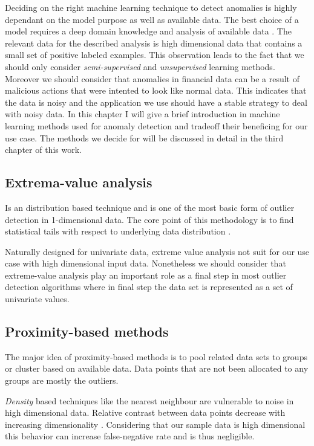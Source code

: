 Deciding on the right machine learning technique to detect anomalies is highly dependant on the model purpose as well as available data. The best choice of a model requires a deep domain knowledge and analysis of available data \cite{Aggarwal:2013}. The relevant data for the described analysis is high dimensional data that contains a small set of positive labeled examples. This observation leads to the fact that we should only consider \textit{semi-supervised} and \textit{unsupervised} learning methods. Moreover we should consider that anomalies in financial data can be a result of malicious actions that were intented to look like normal data. This indicates that the data is noisy and the application we use should have a stable strategy to deal with noisy data. 
In this chapter I will give a brief introduction in  machine learning methods used for anomaly detection and tradeoff their beneficing for our use case. The methods we decide for will be discussed in detail in the third chapter of this work.

\subsection{Extrema-value analysis}

Is an distribution based technique and is one of the most basic form of outlier detection in 1-dimensional data. The core point of this methodology is to find statistical tails with respect to underlying data distribution \cite{Aggarwal:2013}.

Naturally designed for univariate data, extreme value analysis not suit for our use case with high dimensional input data. Nonetheless we should consider that extreme-value analysis play an important role as a final step in most outlier detection algorithms where in final step the data set is represented as a set of univariate values.

\subsection{Proximity-based methods}

The major idea of proximity-based methods is to pool related data sets to groups or cluster based on available data. Data points that are not been allocated to any groups are mostly the outliers.

\textit{Density} based techniques like the nearest neighbour are vulnerable to noise in high dimensional data. Relative contrast between data points decrease with increasing dimensionality \cite{Hinneburg:2000:NNH:645926.671675}. Considering that our sample data is high dimensional this behavior can increase false-negative rate and is thus negligible. 

